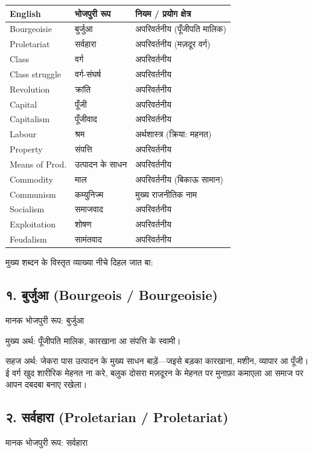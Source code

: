 \documentclass[12pt,a4paper,oneside]{book}
\begin{document}
\begingroup
\small
\begin{longtable}{|l|l|p{7.5cm}|}
\hline
\textbf{English} & \textbf{भोजपुरी रूप} & \textbf{नियम / प्रयोग क्षेत्र} \\ \hline \endhead
Bourgeoisie & बुर्जुआ & अपरिवर्तनीय (पूँजीपति मालिक) \\ \hline
Proletariat & सर्वहारा & अपरिवर्तनीय (मज़दूर वर्ग) \\ \hline
Class & वर्ग & अपरिवर्तनीय \\ \hline
Class struggle & वर्ग-संघर्ष & अपरिवर्तनीय \\ \hline
Revolution & क्रांति & अपरिवर्तनीय \\ \hline
Capital & पूँजी & अपरिवर्तनीय \\ \hline
Capitalism & पूँजीवाद & अपरिवर्तनीय \\ \hline
Labour & श्रम & अर्थशास्त्र (क्रिया: महनत) \\ \hline
Property & संपत्ति & अपरिवर्तनीय \\ \hline
Means of Prod. & उत्पादन के साधन & अपरिवर्तनीय \\ \hline
Commodity & माल & अपरिवर्तनीय (बिकाऊ सामान) \\ \hline
Communism & कम्युनिज्म & मुख्य राजनीतिक नाम \\ \hline
Socialism & समाजवाद & अपरिवर्तनीय \\ \hline
Exploitation & शोषण & अपरिवर्तनीय \\ \hline
Feudalism & सामंतवाद & अपरिवर्तनीय \\ \hline
\end{longtable}
\endgroup

मुख्य शब्दन के विस्तृत व्याख्या नीचे दिहल जात बा:


\subsection*{१. बुर्जुआ {\engfont (Bourgeois / Bourgeoisie)}}
मानक भोजपुरी रूप: बुर्जुआ

मुख्य अर्थ: पूँजीपति मालिक, कारखाना आ संपत्ति के स्वामी।

सहज अर्थ: जेकरा पास उत्पादन के मुख्य साधन बाड़ें—जइसे बड़का कारखाना, मशीन, व्यापार आ पूँजी। ई वर्ग खुद शारीरिक मेहनत ना करे, बलुक दोसरा मज़दूरन के मेहनत पर मुनाफ़ा कमाएला आ समाज पर आपन दबदबा बनाए रखेला।


\subsection*{२. सर्वहारा {\engfont (Proletarian / Proletariat)}}
मानक भोजपुरी रूप: सर्वहारा
\end{document}

